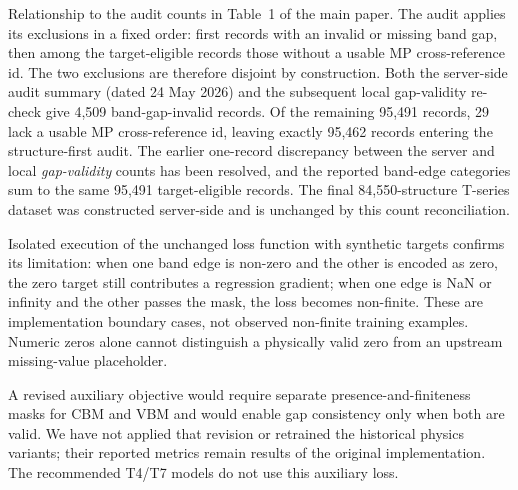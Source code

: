 \documentclass[a4paper,10pt]{article}
\begin{document}
Relationship to the audit counts in Table~1 of the main paper. The
audit applies its exclusions in a fixed order: first records with an
invalid or missing band gap, then among the target-eligible records
those without a usable MP cross-reference id. The two exclusions are
therefore disjoint by construction. Both the server-side audit summary
(dated 24 May 2026) and the subsequent local gap-validity re-check give
4,509 band-gap-invalid records. Of the remaining 95,491 records, 29
lack a usable MP cross-reference id, leaving exactly 95,462 records
entering the structure-first audit. The earlier one-record discrepancy
between the server and local \emph{gap-validity} counts has been
resolved, and the reported band-edge categories sum to the same
95,491 target-eligible records. The final 84,550-structure T-series
dataset was constructed server-side and is unchanged by this count
reconciliation.

Isolated execution of the unchanged loss function with synthetic targets
confirms its limitation: when one band edge is non-zero and the other is
encoded as zero, the zero target still contributes a regression gradient;
when one edge is NaN or infinity and the other passes the mask, the loss
becomes non-finite. These are implementation boundary cases, not observed
non-finite training examples. Numeric zeros alone cannot distinguish a
physically valid zero from an upstream missing-value placeholder.

A revised auxiliary objective would require separate presence-and-finiteness
masks for CBM and VBM and would enable gap consistency only when both are
valid. We have not applied that revision or retrained the historical
physics variants; their reported metrics remain results of the original
implementation. The recommended T4/T7 models do not use this auxiliary loss.
\end{document}
